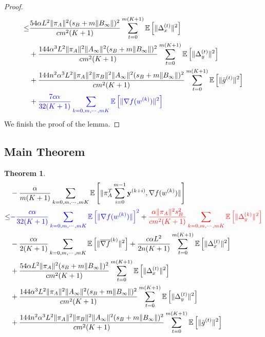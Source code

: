 \documentclass{article}
\newtheorem{theorem}{Theorem}
\newcommand{\vy}{{\mathbf{y}}}
\newcommand{\EE}[1]{\mathbb{E}\left[#1\right]}
\newcommand{\norm}[1]{\| #1 \|}
\begin{document}
\begin{proof}
\begin{align*}
    \leq&\frac{54\alpha L^2\norm{\pi_A}^2(s_B+m\norm{B_{\infty}})^2}{cm^2(K+1)}\sum_{t=0}^{m(K+1)}\EE{\norm{\Delta_x^{(t)}}^2}\\&+\frac{144\alpha^3L^2\norm{\pi_A}^2\norm{A_{\infty}}^2(s_B+m\norm{B_{\infty}})^2}{cm^2(K+1)}\sum_{t=0}^{m(K+1)}\EE{\norm{\Delta_y^{(t)}}^2}
    \\&+\frac{144n^2\alpha^3L^2\norm{\pi_A}^2\norm{\pi_B}^2\norm{A_{\infty}}^2(s_B+m\norm{B_{\infty}})^2}{cm^2(K+1)}\sum_{t=0}^{m(K+1)}\EE{\norm{\bar{g}^{(t)}}^2}\\&+\textcolor{blue}{\frac{7c\alpha}{32(K+1)}\sum_{k=0,m,\cdots,mK}\EE{\norm{\nabla f(w^{(k)})}^2}}
  \end{align*}
  We finish the proof of the lemma.
\end{proof}

\subsection{Main Theorem}
\begin{theorem}\label{Convergence Analysis: Quadratic Term-Decomposition, theorem}
  \begin{align*}
    &-\frac{\alpha}{m(K+1)}\sum_{k=0,m,\cdots,mK}\EE{\norm{\pi_A^T\sum_{i=0}^{m-1}\vy^{(k+i)},\nabla f(w^{(k)}) }}\\
    \leq& \textcolor{blue}{-\frac{c\alpha}{32(K+1)}\sum_{k=0,m,\cdots,mK}\EE{\norm{\nabla f(w^{(k)})}}^2}+\textcolor{red}{\frac{\alpha\norm{\pi_A}^2s_B^2}{cm^2(K+1)}\sum_{k=0,m,\cdots,mK}\EE{\norm{\Delta_y^{(k)}}^2}}\\&-\frac{c\alpha }{2(K+1)}\sum_{k=0,m,\cdots,mK}\EE{\norm{\overline{\nabla f}^{(k)}}^2}+\frac{c\alpha L^2}{2n(K+1)}\sum_{t=0}^{m(K+1)}\EE{\norm{\Delta_x^{(t)}}^2}\\&+\frac{54\alpha L^2\norm{\pi_A}^2(s_B+m\norm{B_{\infty}})^2}{cm^2(K+1)}\sum_{t=0}^{m(K+1)}\EE{\norm{\Delta_x^{(t)}}^2}\\&+\frac{144\alpha^3L^2\norm{\pi_A}^2\norm{A_{\infty}}^2(s_B+m\norm{B_{\infty}})^2}{cm^2(K+1)}\sum_{t=0}^{m(K+1)}\EE{\norm{\Delta_y^{(t)}}^2}
    \\&+\frac{144n^2\alpha^3L^2\norm{\pi_A}^2\norm{\pi_B}^2\norm{A_{\infty}}^2(s_B+m\norm{B_{\infty}})^2}{cm^2(K+1)}\sum_{t=0}^{m(K+1)}\EE{\norm{\bar{g}^{(t)}}^2}
  \end{align*}
\end{theorem}
\end{document}
